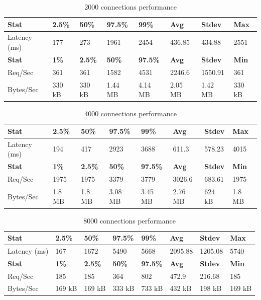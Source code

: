 \documentclass[../Main.tex]{subfiles}
\begin{document}
\begin{table}[H]
\centering
\begin{tabular}{|l|l|l|l|l|l|l|l|}
\hline
\rowcolor[HTML]{f56b00}
\textbf{Stat} & \textbf{2.5\%} & \textbf{50\%} & \textbf{97.5\%} & \textbf{99\%} & \textbf{Avg} & \textbf{Stdev} & \textbf{Max} \\
\hline
Latency (ms) & 177 & 273 & 1961 & 2454 & 436.85 & 434.88 & 2551 \\
\hline
\rowcolor[HTML]{f56b00}
\textbf{Stat} & \textbf{1\%} & \textbf{2.5\%} & \textbf{50\%} & \textbf{97.5\%} & \textbf{Avg} & \textbf{Stdev} & \textbf{Min} \\
\hline
Req/Sec & 361 & 361 & 1582 & 4531 & 2246.6 & 1550.91 & 361 \\
\hline
Bytes/Sec & 330 kB & 330 kB & 1.44 MB & 4.14 MB & 2.05 MB & 1.42 MB & 330 kB \\
\hline
\end{tabular}
 \caption{2000 connections performance}
 \label{2000-connections-performance}
\end{table}


\begin{table}[H]
   \centering
\begin{tabular}{|l|l|l|l|l|l|l|l|}
\hline
\rowcolor[HTML]{f56b00}
\textbf{Stat} & \textbf{2.5\%} & \textbf{50\%} & \textbf{97.5\%} & \textbf{99\%} & \textbf{Avg} & \textbf{Stdev} & \textbf{Max} \\
\hline
Latency (ms) & 194 & 417 & 2923 & 3688 & 611.3 & 578.23 & 4015 \\
\hline
\rowcolor[HTML]{f56b00}
\textbf{Stat} & \textbf{1\%} & \textbf{2.5\%} & \textbf{50\%} & \textbf{97.5\%} & \textbf{Avg} & \textbf{Stdev} & \textbf{Min} \\
\hline
Req/Sec & 1975 & 1975 & 3379 & 3779 & 3026.6 & 683.61 & 1975 \\
\hline
Bytes/Sec & 1.8 MB & 1.8 MB & 3.08 MB & 3.45 MB & 2.76 MB & 624 kB & 1.8 MB \\
\hline
\end{tabular}
 \caption{4000 connections performance}
 \label{4000-connections-performance} \end{table}


\begin{table}[H]
  \centering
\begin{tabular}{|l|l|l|l|l|l|l|l|}
\hline
\rowcolor[HTML]{f56b00}
\textbf{Stat} & \textbf{2.5\%} & \textbf{50\%} & \textbf{97.5\%} & \textbf{99\%} & \textbf{Avg} & \textbf{Stdev} & \textbf{Max} \\
\hline
Latency (ms) & 167 & 1672 & 5490 & 5668 & 2095.88 & 1205.08 & 5740 \\
\hline
\rowcolor[HTML]{f56b00}
\textbf{Stat} & \textbf{1\%} & \textbf{2.5\%} & \textbf{50\%} & \textbf{97.5\%} & \textbf{Avg} & \textbf{Stdev} & \textbf{Min} \\
\hline
Req/Sec & 185 & 185 & 364 & 802 & 472.9 & 216.68 & 185 \\
\hline
Bytes/Sec & 169 kB & 169 kB & 333 kB & 733 kB & 432 kB & 198 kB & 169 kB \\
\hline
\end{tabular}
 \caption{8000 connections performance}
 \label{8000-connections-performance}
\end{table}
\end{document}
